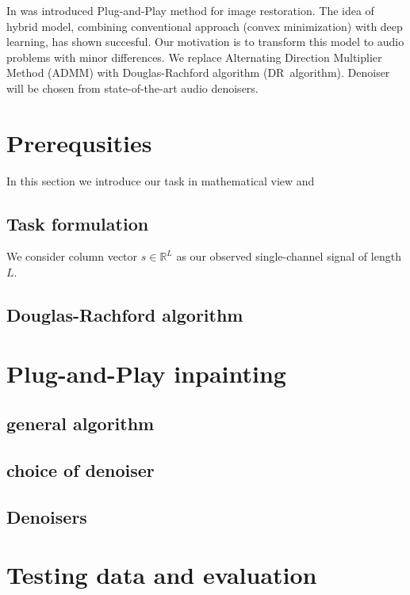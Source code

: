 \documentclass[conference]{IEEEtran}
\begin{document}
In \cite{Chan2016} was introduced Plug-and-Play method for image restoration.
The idea of hybrid model,
combining conventional approach (convex minimization) with deep learning,
has shown succesful.
Our motivation is to transform this model to audio problems with minor differences.
We replace Alternating Direction Multiplier Method (ADMM) with Douglas-Rachford algorithm (DR~algorithm).
Denoiser will be chosen from state-of-the-art audio denoisers. 
 

\section{Prerequsities}

In this section we introduce our task in mathematical view and 
\subsection{Task formulation}

We consider column vector $ s \in \mathbb{R}^{L} $ as our observed single-channel signal of length $ L $.
 

\subsection{Douglas-Rachford algorithm}



\section{Plug-and-Play inpainting}

\subsection{general algorithm}

\subsection{choice of denoiser}

\subsection{Denoisers}

\section{Testing data and evaluation}
\end{document}
